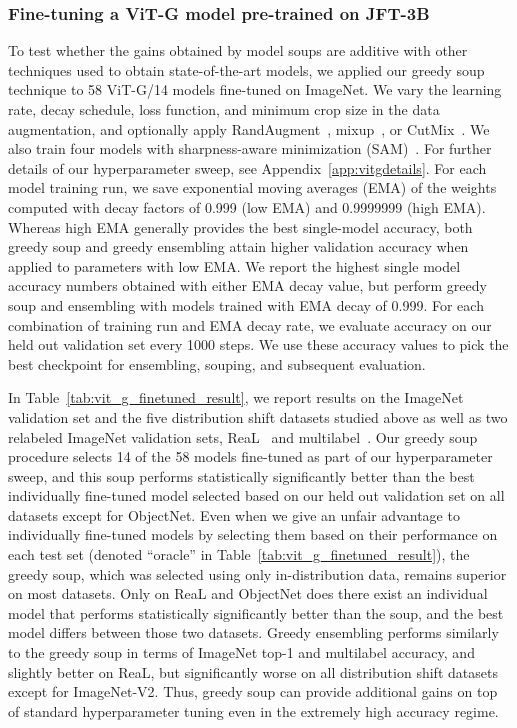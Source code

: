 \documentclass[nohyperref]{article}
\theoremstyle{plain}
\theoremstyle{definition}
\theoremstyle{remark}
\begin{document}
        
        
     
    \subsubsection{Fine-tuning a ViT-G model pre-trained on JFT-3B}\label{sec:jft}
    \label{sec:vit-g}
    
    To test whether the gains obtained by model soups are additive with other techniques used to obtain state-of-the-art models, we applied our greedy soup technique to 58 ViT-G/14 models fine-tuned on ImageNet. We vary the learning rate, decay schedule, loss function, and minimum crop size in the data augmentation, and optionally apply RandAugment~\cite{cubuk2020randaugment}, mixup~\cite{zhang2017mixup}, or CutMix~\cite{yun2019cutmix}. We also train four models with sharpness-aware minimization (SAM)~\cite{foret2021sharpnessaware}. For further details of our hyperparameter sweep, see Appendix~\ref{app:vitgdetails}. For each model training run, we save exponential moving averages (EMA) of the weights~\cite{szegedy2016rethinking} computed with decay factors of 0.999 (low EMA) and 0.9999999 (high EMA). Whereas high EMA generally provides the best single-model accuracy, both greedy soup and greedy ensembling attain higher validation accuracy when applied to parameters with low EMA. We report the highest single model accuracy numbers obtained with either EMA decay value, but perform greedy soup and ensembling with models trained with EMA decay of 0.999. For each combination of training run and EMA decay rate, we evaluate accuracy on our held out validation set every 1000 steps. We use these accuracy values to pick the best checkpoint for ensembling, souping, and subsequent evaluation.
    
    In Table~\ref{tab:vit_g_finetuned_result}, we report results on the ImageNet validation set and the five distribution shift datasets studied above as well as two relabeled ImageNet validation sets, ReaL~\cite{beyer2020we} and multilabel~\cite{shankar2020evaluating}. Our greedy soup procedure selects 14 of the 58 models fine-tuned as part of our hyperparameter sweep, and this soup performs statistically significantly better than the best individually fine-tuned model selected based on our held out validation set on all datasets except for ObjectNet. Even when we give an unfair advantage to individually fine-tuned models by selecting them based on their performance on each test set (denoted ``oracle'' in Table~\ref{tab:vit_g_finetuned_result}), the greedy soup, which was selected using only in-distribution data, remains superior on most datasets. Only on ReaL and ObjectNet does there exist an individual model that performs statistically significantly better than the soup, and the best model differs between those two datasets. Greedy ensembling performs similarly to the greedy soup in terms of ImageNet top-1 and multilabel accuracy, and slightly better on ReaL, but significantly worse on all distribution shift datasets except for ImageNet-V2. Thus, greedy soup can provide additional gains on top of standard hyperparameter tuning even in the extremely high accuracy regime.%
        
\end{document}

